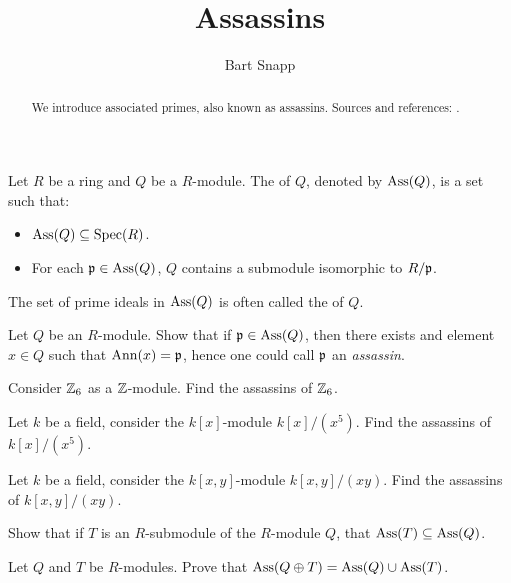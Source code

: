 \documentclass{ximera}
\author{Bart Snapp}
\title{Assassins}
\begin{document}
\begin{abstract}
  We introduce associated primes, also known as assassins. Sources and
  references: \cite{sD2008, dE1995, mR1995}.
\end{abstract}
\maketitle

\begin{definition}
  Let $R$ be a ring and $Q$ be a $R$-module. The  of
  $Q$, denoted by $\operatorname{Ass}(Q)$, is a set such that:
  \begin{itemize}
  \item $\operatorname{Ass}(Q)\subseteq\operatorname{Spec}(R)$.
  \item For each $\mathfrak{p}\in\operatorname{Ass}(Q)$, $Q$ contains a submodule isomorphic
    to $R/\mathfrak{p}$.
  \end{itemize}
  The set of prime ideals in $\operatorname{Ass}(Q)$ is often called the
   of $Q$.
\end{definition}

\begin{exercise}
  Let $Q$ be an $R$-module. Show that if $\mathfrak{p}\in\operatorname{Ass}(Q)$, then there
  exists and element $x\in Q$ such that $\operatorname{Ann}(x) = \mathfrak{p}$, hence one
  could call $\mathfrak{p}$ an \textit{assassin}.
\end{exercise}

\begin{exercise}
  Consider $\mathbb Z_6$ as a $\mathbb Z$-module. Find the assassins of $\mathbb Z_6$.
\end{exercise}

\begin{exercise}
  Let $k$ be a field, consider the $k[x]$-module $k[x]/(x^5)$. Find
  the assassins of $k[x]/(x^5)$.
\end{exercise}

\begin{exercise}
  Let $k$ be a field, consider the $k[x,y]$-module $k[x,y]/(xy)$. Find
  the assassins of $k[x,y]/(xy)$.
\end{exercise}

\begin{exercise}
  Show that if $T$ is an $R$-submodule of the $R$-module $Q$, that
  $\operatorname{Ass}(T) \subseteq \operatorname{Ass}(Q)$.
\end{exercise}


\begin{exercise}
  Let $Q$ and $T$ be $R$-modules. Prove that $\operatorname{Ass}(Q\oplus T) = \operatorname{Ass}(Q)\cup\operatorname{Ass}(T)$.
\end{exercise}
\end{document}
